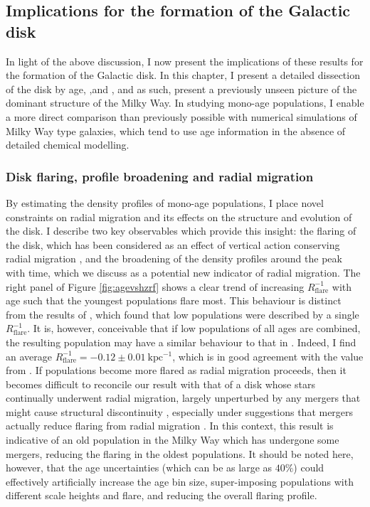 \subsection{Implications for the formation of the Galactic disk}
\label{sec:implications}

In light of the above discussion, I now present the implications of these results for the formation of the Galactic disk. In this chapter, I present a detailed dissection of the disk by age, \feh{},and \afe{}, and as such, present a previously unseen picture of the dominant structure of the Milky Way. In studying mono-age populations, I enable a more direct comparison than previously possible with numerical simulations of Milky Way type galaxies, which tend to use age information in the absence of detailed chemical modelling.

\subsubsection{Disk flaring, profile broadening and radial migration}

By estimating the density profiles of mono-age populations, I  place novel constraints on radial migration and its effects on the structure and evolution of the disk. I describe two key observables which provide this insight: the flaring of the disk, which has been considered as an effect of vertical action conserving radial migration \citep[where stars have greater vertical excursions as they migrate outward, e.g.][]{2012A&A...548A.127M}, and the broadening of the density profiles around the peak with time, which we discuss as a potential new indicator of radial migration. The right panel of Figure \ref{fig:agevshzrf} shows a clear trend of increasing $R_{\mathrm{flare}}^{-1}$ with age such that the youngest populations flare most. This behaviour is distinct from the results of \citet{2016ApJ...823...30B}, which found that low \afe{} populations were described by a single $R_{\mathrm{flare}}^{-1}$. It is, however, conceivable that if low \afe{} populations of all ages are combined, the resulting population may have a similar behaviour to that in \citet{2016ApJ...823...30B}. Indeed, I find an average $R_{\mathrm{flare}}^{-1} = -0.12\pm 0.01\ \mathrm{kpc^{-1}}$, which is in good agreement with the value from \citet{2016ApJ...823...30B}. If populations become more flared as radial migration proceeds, then it becomes difficult to reconcile our result with that of a disk whose stars continually underwent radial migration, largely unperturbed by any mergers that might cause structural discontinuity \citep[e.g.][]{2014MNRAS.442.2474M}, especially under suggestions that mergers actually reduce flaring from radial migration \citep[e.g.][]{2014A&A...572A..92M}. In this context, this result is indicative of an old population in the Milky Way which has undergone some mergers, reducing the flaring in the oldest populations. It should be noted here, however, that the age uncertainties (which can be as large as $40\%$) could effectively artificially increase the age bin size, super-imposing populations with different scale heights and flare, and reducing the overall flaring profile.

